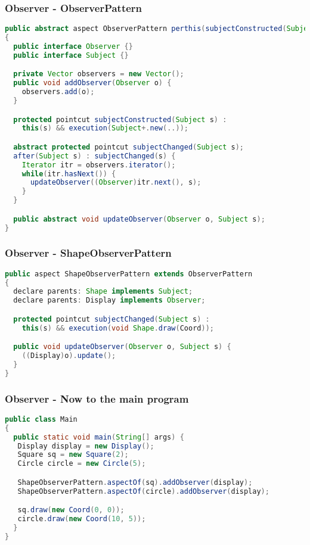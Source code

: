 \documentclass[11pt]{beamer}
\begin{document}
\begin{frame}[fragile]
   \frametitle{Observer - ObserverPattern}
   {\tiny
   \begin{lstlisting}[language=java]
public abstract aspect ObserverPattern perthis(subjectConstructed(Subject))
{
  public interface Observer {}
  public interface Subject {}

  private Vector observers = new Vector();
  public void addObserver(Observer o) {
    observers.add(o);
  }

  protected pointcut subjectConstructed(Subject s) :
    this(s) && execution(Subject+.new(..));

  abstract protected pointcut subjectChanged(Subject s);
  after(Subject s) : subjectChanged(s) {
    Iterator itr = observers.iterator();
    while(itr.hasNext()) {
      updateObserver((Observer)itr.next(), s);
    }
  }

  public abstract void updateObserver(Observer o, Subject s);
}
   \end{lstlisting}
   }
\end{frame}

\begin{frame}[fragile]
   \frametitle{Observer - ShapeObserverPattern}
   {\footnotesize
   \begin{lstlisting}[language=java]
public aspect ShapeObserverPattern extends ObserverPattern
{
  declare parents: Shape implements Subject;
  declare parents: Display implements Observer;

  protected pointcut subjectChanged(Subject s) :
    this(s) && execution(void Shape.draw(Coord));

  public void updateObserver(Observer o, Subject s) {
    ((Display)o).update();
  }
}
   \end{lstlisting}
   }
\end{frame}

\begin{frame}[fragile]
   \frametitle{Observer - Now to the main program}
   {\scriptsize
\begin{lstlisting}[language=java]
public class Main
{
  public static void main(String[] args) {
   Display display = new Display();
   Square sq = new Square(2);
   Circle circle = new Circle(5);

   ShapeObserverPattern.aspectOf(sq).addObserver(display);
   ShapeObserverPattern.aspectOf(circle).addObserver(display);

   sq.draw(new Coord(0, 0));
   circle.draw(new Coord(10, 5));
  }
}
\end{lstlisting}
   }
\end{frame}
\end{document}
